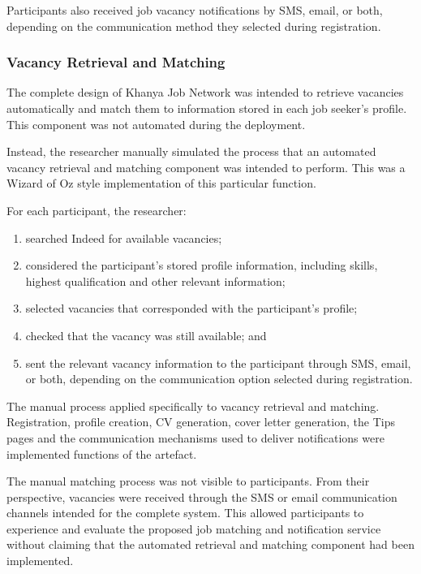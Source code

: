Participants also received job vacancy notifications by SMS, email, or both, depending on the communication method they selected during registration.


\subsubsection{Vacancy Retrieval and Matching}

The complete design of Khanya Job Network was intended to retrieve vacancies automatically and match them to information stored in each job seeker's profile. This component was not automated during the deployment.

Instead, the researcher manually simulated the process that an automated vacancy retrieval and matching component was intended to perform. This was a Wizard of Oz style implementation of this particular function.

For each participant, the researcher:

\begin{enumerate}
    \item searched Indeed for available vacancies;
    \item considered the participant's stored profile information, including skills, highest qualification and other relevant information;
    \item selected vacancies that corresponded with the participant's profile;
    \item checked that the vacancy was still available; and
    \item sent the relevant vacancy information to the participant through SMS, email, or both, depending on the communication option selected during registration.
\end{enumerate}

The manual process applied specifically to vacancy retrieval and matching. Registration, profile creation, CV generation, cover letter generation, the Tips pages and the communication mechanisms used to deliver notifications were implemented functions of the artefact.

The manual matching process was not visible to participants. From their perspective, vacancies were received through the SMS or email communication channels intended for the complete system. This allowed participants to experience and evaluate the proposed job matching and notification service without claiming that the automated retrieval and matching component had been implemented.


